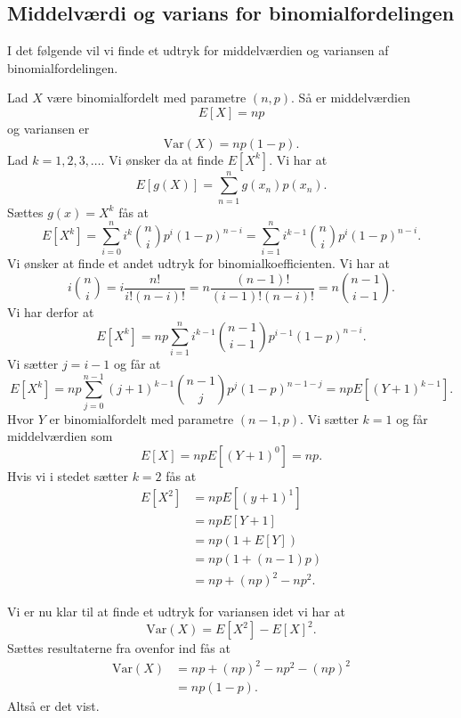 \subsection{Middelværdi og varians for binomialfordelingen}
I det følgende vil vi finde et udtryk for middelværdien og variansen af binomialfordelingen.
\begin{sæt}
  Lad $X$ være binomialfordelt med parametre $(n,p)$. Så er middelværdien
  \[
    E[X] = np
  \]
  og variansen er
  \[ 
    \mathrm{Var}(X) = np(1-p)
  .\]
  \tcblower
  Lad $k = 1,2,3,\ldots$. Vi ønsker da at finde $E \left[ X^k \right]$. Vi har at
  \[ 
    E[g(X)] = \sum_{n = 1}^{n} g(x_n) p(x_n)
  .\]
  Sættes $g(x) = X^k$ fås at
  \[ 
    E \left[ X^k \right] = \sum_{i = 0}^{n} i^{k} \binom{n}{i}p^i(1-p)^{n-i} = \sum_{i = 1}^{n} i^{k-1} \binom{n}{i}p^{i}(1-p)^{n-i}
  .\]
  Vi ønsker at finde et andet udtryk for binomialkoefficienten. Vi har at
  \[ 
  i \binom{n}{i} = i\frac{n!}{i!(n-i)!} = n\frac{(n-1)!}{(i-1)!(n-i)!} = n \binom{n-1}{i-1}
  .\]
  Vi har derfor at
  \[ 
  E \left[ X^k \right] = np \sum_{i = 1}^{n} i^{k-1} \binom{n-1}{i-1}p^{i-1}(1-p)^{n-i}
  .\]
  Vi sætter $j = i-1$ og får at
  \[ 
    E \left[ X^k \right] = np \sum_{j = 0}^{n-1} (j+1)^{k-1} \binom{n-1}{j}p^j(1-p)^{n-1-j} = npE \left[ (Y+1)^{k-1} \right]
  .\]
  Hvor $Y$ er binomialfordelt med parametre $(n-1, p)$. Vi sætter $k = 1$ og får middelværdien som
  \[ 
    E[X] = npE \left[ (Y+1)^{0} \right] = np
  .\]
  Hvis vi i stedet sætter $k = 2$ fås at
  \begin{align*}
    E \left[ X^2 \right] &= npE \left[ (y+1)^1 \right] \\
    &= npE[Y+1] \\
    &= np(1+E[Y]) \\
    &= np(1+(n-1)p) \\
    &= np + (np)^2 - np^2
  .\end{align*}

  Vi er nu klar til at finde et udtryk for variansen idet vi har at
  \[ 
    \mathrm{Var}(X) = E[X^2] - E[X]^2
  .\]
  Sættes resultaterne fra ovenfor ind fås at
  \begin{align*}
    \mathrm{Var}(X) &= np + (np)^2 - np^2 - (np)^2 \\
    &= np(1-p)
  .\end{align*}
  Altså er det vist.
\end{sæt}

